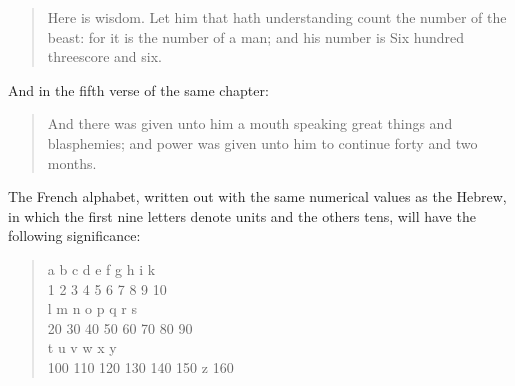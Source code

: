 \begin{quote}
Here is wisdom. Let him that hath understanding count the number
of the beast: for it is the number of a man; and his number is
Six hundred threescore and six.
\end{quote}

And in the fifth verse of the same chapter:

\begin{quote}
And there was given unto him a mouth speaking great things and
blasphemies; and power was given unto him to continue forty and
two months.
\end{quote}

The French alphabet, written out with the same numerical values
as the Hebrew, in which the first nine letters denote units and
the others tens, will have the following significance:

\begin{quote} \small
a b c d e f g h i k \\ 
1 2 3 4 5 6 7 8 9 10 \\ 
l m n o p q r s \\ 
20 30 40 50 60 70 80 90 \\
t u v w x y \\ 
100 110 120 130 140 150 z 160
\end{quote}

